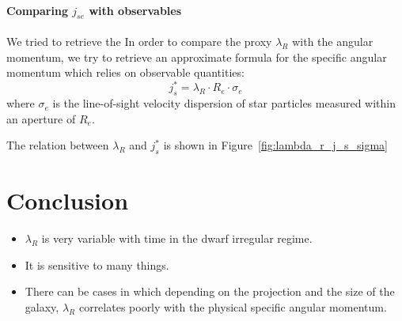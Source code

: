 \paragraph{Comparing $j_{se}$ with observables} We tried to retrieve the In order to compare the proxy $\lambda_R$ with the angular momentum, we try to retrieve an approximate formula for the specific angular momentum which relies on observable quantities:
\begin{equation}
 j_s^* = \lambda_R \cdot R_e \cdot \sigma_e 
\end{equation}
where $\sigma_e$ is the line-of-sight velocity dispersion of star particles measured within an aperture of $R_e$.


The relation between $\lambda_R$ and $j_s^*$ is shown in Figure~\ref{fig:lambda_r_j_s_sigma}

% 

\section{Conclusion}

\begin{itemize}
 \item $\lambda_R$ is very variable with time in the dwarf irregular regime.
 \item It is sensitive to many things. %
 \item There can be cases in which depending on the projection and the size of the galaxy, $\lambda_R$ correlates poorly with the physical specific angular momentum.
\end{itemize}


% 

